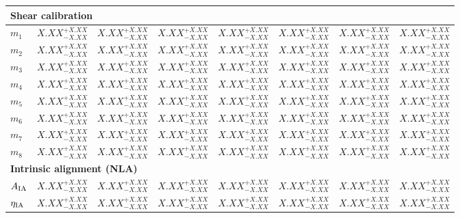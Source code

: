 \documentclass[%
reprint,
superscriptaddress,
 amsmath,amssymb,
 aps,
]{revtex4-2}
\newcommand{\dvres}{$X.XX^{+X.XX}_{-X.XX}$}
\begin{document}
\begin{table}[htbp]
\begin{tabular}{l*{7}{c}}
\hline
\multicolumn{8}{l}{\textbf{Shear calibration}} \\
\hline
$m_1$ & \dvres & \dvres & \dvres & \dvres & \dvres & \dvres & \dvres \\
$m_2$ & \dvres & \dvres & \dvres & \dvres & \dvres & \dvres & \dvres \\
$m_3$ & \dvres & \dvres & \dvres & \dvres & \dvres & \dvres & \dvres \\
$m_4$ & \dvres & \dvres & \dvres & \dvres & \dvres & \dvres & \dvres \\
$m_5$ & \dvres & \dvres & \dvres & \dvres & \dvres & \dvres & \dvres \\
$m_6$ & \dvres & \dvres & \dvres & \dvres & \dvres & \dvres & \dvres \\
$m_7$ & \dvres & \dvres & \dvres & \dvres & \dvres & \dvres & \dvres \\
$m_8$ & \dvres & \dvres & \dvres & \dvres & \dvres & \dvres & \dvres \\

\hline
\multicolumn{8}{l}{\textbf{Intrinsic alignment (NLA)}} \\
\hline
$A_{\rm IA}$ & \dvres & \dvres & \dvres & \dvres & \dvres & \dvres & \dvres \\
$\eta_{\rm IA}$ & \dvres & \dvres & \dvres & \dvres & \dvres & \dvres & \dvres \\

\hline\hline
\end{tabular}
\end{table}
\end{document}

